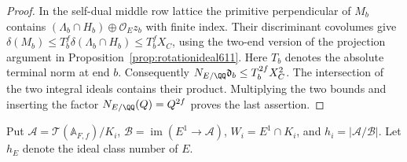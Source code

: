 \documentclass[a4paper,11pt]{article}
\theoremstyle{definition}
\theoremstyle{remark}
\numberwithin{equation}{section}
\begin{document}
\begin{proof}
In the self-dual middle row lattice the primitive perpendicular of
\(M_b\) contains \((\Lambda_b\cap H_b)\oplus\mathcal O_E z_b\)
with finite index. Their discriminant covolumes give
\(\delta(M_b)\le T_b^f\delta(\Lambda_b\cap H_b)\le T_b^f X_C\),
using the two-end version of the projection argument in
Proposition~\ref{prop:rotationideal611}. Here \(T_b\) denotes
the absolute terminal norm at end \(b\). Consequently
\(N_{E/\QQ}\mathfrak d_b\le T_b^{2f}X_C^2\).
The intersection of the two integral ideals contains their
product. Multiplying the two bounds and inserting the factor
\(N_{E/\QQ}(Q)=Q^{2f}\) proves the last assertion.
\end{proof}

Put \(\mathcal A=\mathcal T(\mathbb A_{F,f})/K_i\),
\(\mathcal B=\operatorname{im}(E^1\to\mathcal A)\),
\(W_i=E^1\cap K_i\), and \(h_i=|\mathcal A/\mathcal B|\).
Let \(h_E\) denote the ideal class number of \(E\).
\end{document}
